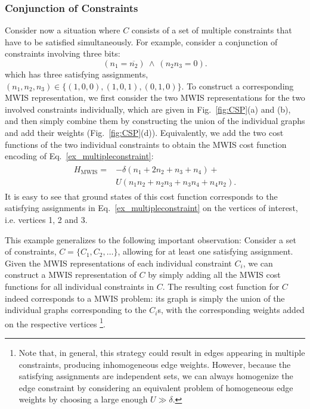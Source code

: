 \subsubsection{Conjunction of Constraints}\label{conjuction_constraints}
Consider now a situation where $C$ consists of a set of multiple constraints that have to be satisfied simultaneously. For example, consider a conjunction of constraints involving three bits:
\begin{equation}
    (n_1 = \overline{n_2}) \ \land \  (n_2n_3 = 0). \label{ex_multipleconstraint}
\end{equation}
 which has three satisfying assignments, $(n_1,n_2,n_3)\in\{(1,0,0),(1,0,1),(0,1,0)\}$. To construct a corresponding MWIS representation, we first consider the two MWIS representations for the two involved constraints individually, which are given in Fig.~\ref{fig:CSP}(a) and (b), and then simply combine them by constructing the union of the individual graphs and add their weights (Fig.~\ref{fig:CSP}(d)). Equivalently, we add the two cost functions of the two individual constraints to obtain the MWIS cost function encoding of  Eq.~\eqref{ex_multipleconstraint}:
\begin{align}\label{eq:multipleconstraint_ham}
    \begin{split}
    H_\text{MWIS} = & -\delta(n_1 + 2n_2 + n_3 + n_4) + \\ 
    & U(n_1n_2 + n_2n_3 + n_3n_4 + n_4 n_2).
    \end{split}
\end{align}
It is easy to see that ground states of this cost function corresponds to the satisfying assignments in Eq.~\eqref{ex_multipleconstraint} on the vertices of interest, i.e. vertices 1, 2 and 3.

This example generalizes to the following important observation: Consider a set of constraints,  $C=\{C_1,C_2,\dots\}$, allowing for at least one satisfying assignment. Given the MWIS representations of each individual constraint $C_i$, we can construct a MWIS representation of $C$ by simply adding all the MWIS cost functions for all individual constraints in $C$.
The resulting cost function for $C$ indeed corresponds to a MWIS problem: its graph is simply the union of the individual graphs corresponding to the $C_i$s, with the corresponding weights added on the respective vertices \footnote{Note that, in general, this strategy could result in edges appearing in multiple constraints, producing inhomogeneous edge weights. However, because the satisfying assignments are independent sets, we can always homogenize the edge constraint by considering an equivalent problem of homogeneous edge weights by choosing a large enough $U\gg \delta$.}.

